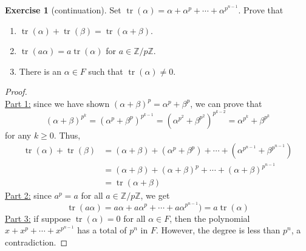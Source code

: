 \documentclass{article}
\theoremstyle{definition}
\newtheorem{exercise}{Exercise}
\begin{document}
\begin{exercise}[continuation]
Set $\operatorname{tr}(\alpha) = \alpha + \alpha^p + \cdots + \alpha^{p^{n - 1}}$. Prove that
\begin{enumerate}
	\item $\operatorname{tr}(\alpha) + \operatorname{tr}(\beta) = \operatorname{tr}(\alpha + \beta)$.
	\item $\operatorname{tr}(a \alpha) = a \operatorname{tr}(\alpha)$ for $a \in \mathbb{Z}/p\mathbb{Z}$.
	\item There is an $\alpha \in F$ such that $\operatorname{tr}(\alpha) \neq 0$.
\end{enumerate}
\end{exercise}
\begin{proof} \ \\
\underline{Part 1:} since we have shown $(\alpha + \beta)^p = \alpha^p + \beta^p$, we can prove that
$$(\alpha + \beta)^{p^k} = (\alpha^p + \beta^p)^{p^{k - 1}} = (\alpha^{p^2} + \beta^{p^2})^{p^{k - 2}} = \alpha^{p^k} + \beta^{p^k}$$
for any $k \geq 0$. Thus,
\begin{align*}
\operatorname{tr}(\alpha) + \operatorname{tr}(\beta) & = (\alpha + \beta) + (\alpha^p + \beta^p) + \cdots + (\alpha^{p^{n - 1}} + \beta^{p^{n - 1}}) \\
& = (\alpha + \beta) + (\alpha + \beta)^p + \cdots + (\alpha + \beta)^{p^{n - 1}} \\
& = \operatorname{tr}(\alpha + \beta)
\end{align*}
\underline{Part 2:} since $a^p = a$ for all $a \in \mathbb{Z}/p\mathbb{Z}$, we get
$$\operatorname{tr}(a \alpha) = a \alpha + a \alpha^p + \cdots + a \alpha^{p^{n - 1}}) = a \operatorname{tr}(\alpha)$$
\underline{Part 3:} if suppose $\operatorname{tr}(\alpha) = 0$ for all $\alpha \in F$, then the polynomial $x + x^p + \cdots + x^{p^{n - 1}}$ has a total of $p^n$ in $F$. However, the degree is less than $p^n$, a contradiction.
\end{proof}

\newpage
\end{document}
